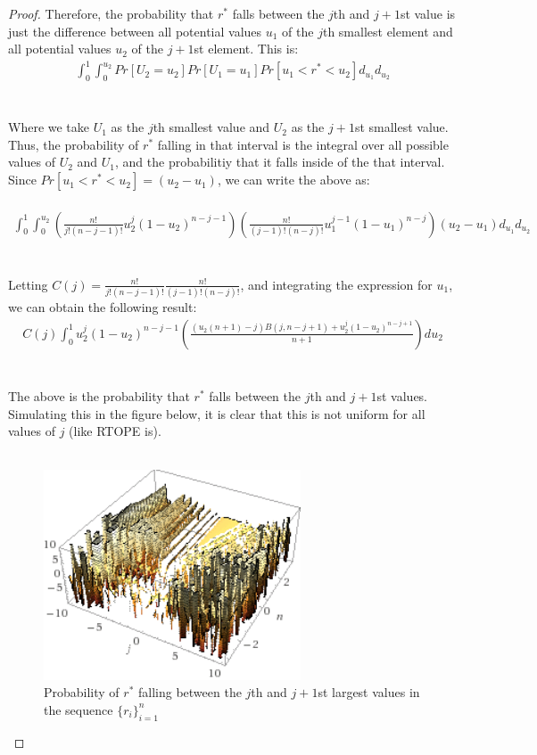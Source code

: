 \documentclass[12pt]{article}
\begin{document}
\begin{proof}
Therefore, the probability that $r^*$ falls between the $j$th and $j+1$st value is just the difference between all potential values $u_1$ of the $j$th smallest element and all potential values $u_2$ of the $j+1$st element. This is:
    \begin{eqnarray}
      \int_{0}^1 \int_0^{u_2} Pr[U_2 = u_2] Pr[U_1 = u_1] Pr[u_1 < r^* < u_2] d_{u_1} d_{u_2}
    \end{eqnarray} \\ \\
Where we take $U_1$ as the $j$th smallest value and $U_2$ as the $j+1$st smallest value. Thus, the probability of $r^*$ falling in that interval is the integral over all possible values of $U_2$ and $U_1$, and the probabilitiy that it falls inside of the that interval. Since $Pr[u_1 < r^* < u_2] = (u_2 - u_1)$, we can write the above as:\\ \\
\begin{eqnarray}
      \int_{0}^1 \int_0^{u_2} \left( \frac{n!}{j!(n-j-1)!} u_2^j (1 - u_2)^{n-j-1} \right) \left( \frac{n!}{(j-1)!(n-j)!} u_1^{j-1} (1 - u_1)^{n-j} \right) (u_2 - u_1) d_{u_1} d_{u_2}
    \end{eqnarray} \\ \\
Letting $C(j) = \frac{n!}{j!(n-j-1)!} \frac{n!}{(j-1)!(n-j)!}$, and integrating the expression for $u_1$, we can obtain the following result:
    \begin{eqnarray}
      C(j) \int_0^1 u_2^j (1 - u_2)^{n-j-1} \left( \frac{(u_2 (n+1) - j) B(j, n-j+1) + u_2^j (1-u_2)^{n-j+1}}{n+1} \right) d u_2
    \end{eqnarray} \\ \\
The above is the probability that $r^*$ falls between the $j$th and $j+1$st values. Simulating this in the figure below, it is clear that this is not uniform for all values of $j$ (like RTOPE is). \\ \\
\begin{figure}[H]
      \centering
      \includegraphics[width=3in]{ball_result.png}
      \caption{Probability of $r^*$ falling between the $j$th and $j+1$st largest values in the sequence $\{r_i\}_{i=1}^n$}
    \end{figure}
  \end{proof}
\end{document}
